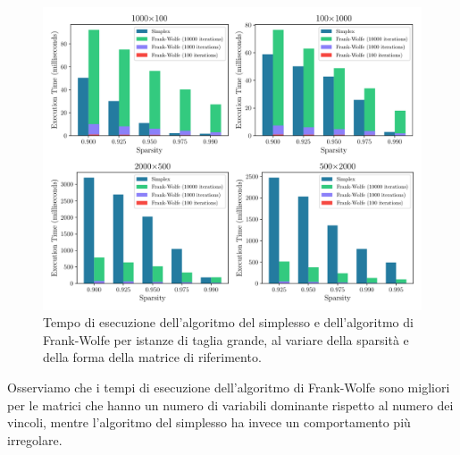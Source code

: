 \begin{figure}[!ht]
    \centering
    \includegraphics[width=\textwidth]{assets/figures/symmetricshape.pdf}
    \caption{Tempo di esecuzione dell'algoritmo del simplesso e dell'algoritmo di Frank-Wolfe per istanze di taglia
    grande, al variare della sparsità e della forma della matrice di riferimento.}
    \label{fig:timeshapelast}
\end{figure}

Osserviamo che i tempi di esecuzione dell'algoritmo di Frank-Wolfe sono migliori per le matrici che hanno un numero di
variabili dominante rispetto al numero dei vincoli, mentre l'algoritmo del simplesso ha invece un comportamento più
irregolare.

